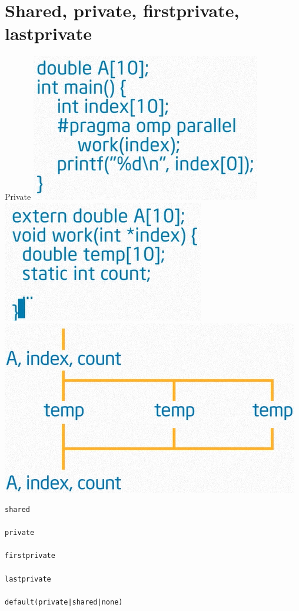 \documentclass{beamer}
\begin{document}
\section{Shared, private, firstprivate, lastprivate}

\begin{frame}{Private}
  \includegraphics[height=0.3\textheight]{private}  
  \includegraphics[height=0.3\textheight]{private2}  
  \includegraphics[height=0.17\textheight]{private3}  
\end{frame}

\begin{frame}[fragile]
\begin{verbatim}
shared

private

firstprivate

lastprivate

default(private|shared|none)
\end{verbatim}
\end{frame}
\end{document}
